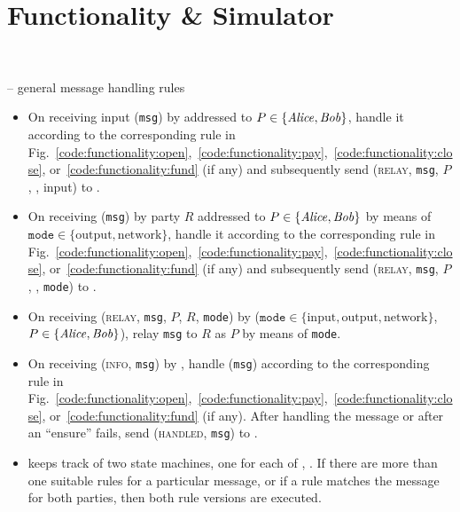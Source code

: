 \section{Functionality \& Simulator} \ \\
\label{sec:functionality}

\begin{center}
  \begin{systembox}{\fchan{} -- general message handling rules}
    \begin{itemize}
      \item On receiving input (\texttt{msg}) by \environment addressed to $P
      \in \{\mathit{Alice}, \mathit{Bob}\}$, handle it according to the corresponding rule in
      Fig.~\ref{code:functionality:open},~\ref{code:functionality:pay},~\ref{code:functionality:close},
      or~\ref{code:functionality:fund} (if any) and subsequently send
      (\textsc{relay}, \texttt{msg}, $P$, \environment, input) to \adversary.
      \item On receiving (\texttt{msg}) by party $R$ addressed to $P \in \{\mathit{Alice}, \mathit{Bob}\}$
      by means of $\texttt{mode} \in \{\mathrm{output},
      \mathrm{network}\}$, handle it according to the corresponding rule in
      Fig.~\ref{code:functionality:open},~\ref{code:functionality:pay},~\ref{code:functionality:close},
      or~\ref{code:functionality:fund} (if any) and subsequently send
      (\textsc{relay}, \texttt{msg}, $P$, \environment, \texttt{mode}) to
      \adversary. 
      \item On receiving (\textsc{relay}, \texttt{msg}, $P$, $R$, \texttt{mode})
      by \adversary ($\texttt{mode} \in \{\mathrm{input}, \mathrm{output},
      \mathrm{network}\}$, $P \in \{\mathit{Alice}, \mathit{Bob}\}$), relay \texttt{msg} to $R$
      as $P$ by means of \texttt{mode}. 
      \item On receiving (\textsc{info}, \texttt{msg}) by \adversary, handle
      (\texttt{msg}) according to the corresponding rule in
      Fig.~\ref{code:functionality:open},~\ref{code:functionality:pay},~\ref{code:functionality:close},
      or~\ref{code:functionality:fund} (if any). After handling the message or
      after an ``ensure'' fails, send (\textsc{handled}, \texttt{msg}) to
      \adversary. 
      \item \fchan keeps track of two state machines, one for each of \alice,
      \bob. If there are more than one suitable rules for a particular message,
      or if a rule matches the message for both parties, then both rule versions
      are executed. 
    \end{itemize}
  \end{systembox}
  \label{code:functionality:rules}
\end{center}
